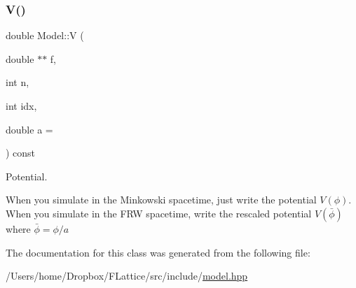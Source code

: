 \subsubsection{\texorpdfstring{V()}{V()}}
{\footnotesize\ttfamily double Model\+::V (\begin{DoxyParamCaption}\item[{double $\ast$$\ast$}]{f,  }\item[{int}]{n,  }\item[{int}]{idx,  }\item[{double}]{a = {} }\end{DoxyParamCaption}) const\hspace{0.3cm}{\ttfamily [inline]}}



Potential. 

When you simulate in the Minkowski spacetime, just write the potential $ V(\phi) $. When you simulate in the F\+RW spacetime, write the rescaled potential $ V(\bar{\phi}) $ where $ \bar{\phi} = \phi / a $ 

The documentation for this class was generated from the following file\+:\begin{DoxyCompactItemize}
\item 
/\+Users/home/\+Dropbox/\+F\+Lattice/src/include/\mbox{\hyperlink{model_8hpp}{model.\+hpp}}\end{DoxyCompactItemize}
